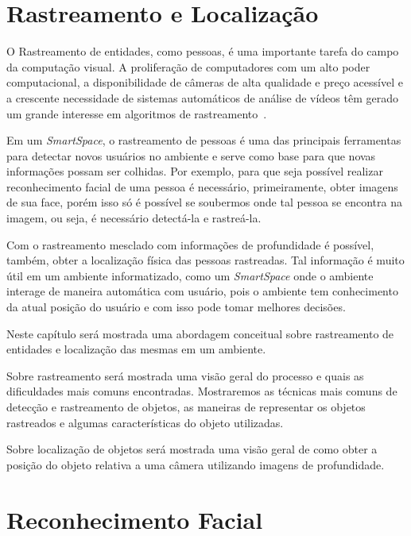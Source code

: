 \chapter{Rastreamento e Localização}

	O Rastreamento de entidades, como pessoas, é uma importante tarefa do campo da computação visual. A proliferação de computadores com um alto poder computacional, a disponibilidade de câmeras de alta qualidade e preço acessível e a crescente necessidade de sistemas automáticos de análise de vídeos têm gerado um grande interesse em algoritmos de rastreamento~\cite{yilmaz}.

	Em um \textit{SmartSpace}, o rastreamento de pessoas é uma das principais ferramentas para detectar novos usuários no ambiente e serve como base para que novas informações possam ser colhidas. Por exemplo, para que seja possível realizar reconhecimento facial de uma pessoa é necessário, primeiramente, obter imagens de sua face, porém isso só é possível se soubermos onde tal pessoa se encontra na imagem, ou seja, é necessário detectá-la e rastreá-la.

	Com o rastreamento mesclado com informações de profundidade é possível, também, obter a localização física das pessoas rastreadas. Tal informação é muito útil em um ambiente informatizado, como um \textit{SmartSpace} onde o ambiente interage de maneira automática com usuário, pois o ambiente tem conhecimento da atual posição do usuário e com isso pode tomar melhores decisões.

	Neste capítulo será mostrada uma abordagem conceitual sobre rastreamento de entidades e localização das mesmas em um ambiente.

	Sobre rastreamento será mostrada uma visão geral do processo e quais as dificuldades mais comuns encontradas. Mostraremos as técnicas mais comuns de detecção e rastreamento de objetos, as maneiras de representar os objetos rastreados e algumas características do objeto utilizadas.

	Sobre localização de objetos será mostrada uma visão geral de como obter a posição do objeto relativa a uma câmera utilizando imagens de profundidade.

	
	

	

\chapter{Reconhecimento Facial}

